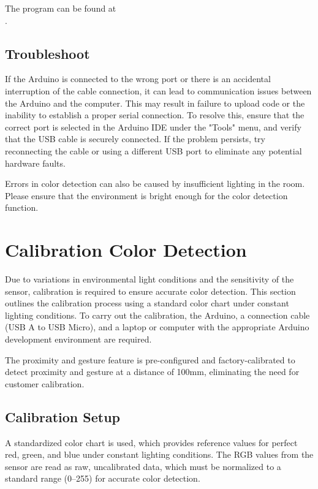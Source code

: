 The program can be found at \\
.

\subsection{Troubleshoot}

If the Arduino is connected to the wrong port or there is an accidental interruption of the cable connection, it can lead to communication issues between the Arduino and the computer. This may result in failure to upload code or the inability to establish a proper serial connection. To resolve this, ensure that the correct port is selected in the Arduino IDE under the "Tools" menu, and verify that the USB cable is securely connected. If the problem persists, try reconnecting the cable or using a different USB port to eliminate any potential hardware faults.

\medskip

Errors in color detection can also be caused by insufficient lighting in the room. Please ensure that the environment is bright enough for the color detection function.

\section{Calibration Color Detection}

Due to variations in environmental light conditions and the sensitivity of the sensor, calibration is required to ensure accurate color detection. This section outlines the calibration process using a standard color chart under constant lighting conditions. To carry out the calibration, the Arduino, a connection cable (USB A to USB Micro), and a laptop or computer with the appropriate Arduino development environment are required.

\medskip

The proximity and gesture feature is pre-configured and factory-calibrated to detect proximity and gesture at a distance of 100mm, eliminating the need for customer calibration.
\cite{BroadcomAPDS9960:2024}

\subsection{Calibration Setup}
A standardized color chart is used, which provides reference values for perfect red, green, and blue under constant lighting conditions. The RGB values from the sensor are read as raw, uncalibrated data, which must be normalized to a standard range (0–255) for accurate color detection.

